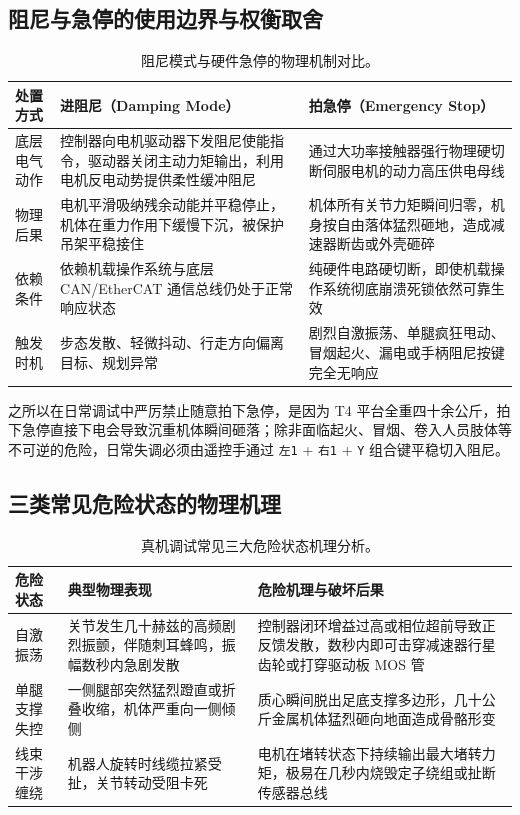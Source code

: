 \subsection{阻尼与急停的使用边界与权衡取舍}

\begin{table}[H]
\centering
\small
\begin{tabularx}{\textwidth}{p{2.2cm} X X}
\toprule
\textbf{处置方式} & \textbf{进阻尼（Damping Mode）} & \textbf{拍急停（Emergency Stop）} \\
\midrule
底层电气动作 & 控制器向电机驱动器下发阻尼使能指令，驱动器关闭主动力矩输出，利用电机反电动势提供柔性缓冲阻尼 & 通过大功率接触器强行物理硬切断伺服电机的动力高压供电母线 \\
\addlinespace
物理后果 & 电机平滑吸纳残余动能并平稳停止，机体在重力作用下缓慢下沉，被保护吊架平稳接住 & 机体所有关节力矩瞬间归零，机身按自由落体猛烈砸地，造成减速器断齿或外壳砸碎 \\
\addlinespace
依赖条件 & 依赖机载操作系统与底层 CAN/EtherCAT 通信总线仍处于正常响应状态 & 纯硬件电路硬切断，即使机载操作系统彻底崩溃死锁依然可靠生效 \\
\addlinespace
触发时机 & 步态发散、轻微抖动、行走方向偏离目标、规划异常 & 剧烈自激振荡、单腿疯狂甩动、冒烟起火、漏电或手柄阻尼按键完全无响应 \\
\bottomrule
\end{tabularx}
\caption{阻尼模式与硬件急停的物理机制对比。}
\end{table}

之所以在日常调试中严厉禁止随意拍下急停，是因为 T4 平台全重四十余公斤，拍下急停直接下电会导致沉重机体瞬间砸落；除非面临起火、冒烟、卷入人员肢体等不可逆的危险，日常失调必须由遥控手通过 \texttt{左1} + \texttt{右1} + \texttt{Y} 组合键平稳切入阻尼。

\subsection{三类常见危险状态的物理机理}

\begin{table}[H]
\centering
\small
\begin{tabularx}{\textwidth}{p{2.6cm} p{4.6cm} X}
\toprule
\textbf{危险状态} & \textbf{典型物理表现} & \textbf{危险机理与破坏后果} \\
\midrule
自激振荡 & 关节发生几十赫兹的高频剧烈振颤，伴随刺耳蜂鸣，振幅数秒内急剧发散 & 控制器闭环增益过高或相位超前导致正反馈发散，数秒内即可击穿减速器行星齿轮或打穿驱动板 MOS 管 \\
\addlinespace
单腿支撑失控 & 一侧腿部突然猛烈蹬直或折叠收缩，机体严重向一侧倾侧 & 质心瞬间脱出足底支撑多边形，几十公斤金属机体猛烈砸向地面造成骨骼形变 \\
\addlinespace
线束干涉缠绕 & 机器人旋转时线缆拉紧受扯，关节转动受阻卡死 & 电机在堵转状态下持续输出最大堵转力矩，极易在几秒内烧毁定子绕组或扯断传感器总线 \\
\bottomrule
\end{tabularx}
\caption{真机调试常见三大危险状态机理分析。}
\end{table}

